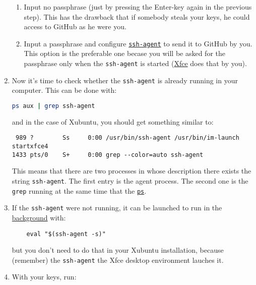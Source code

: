 \begin{enumerate}
  \begin{enumerate}
  \item Input no passphrase (just by pressing the Enter-key again in
    the previous step). This has the drawback that if somebody steals
    your keys, he could access to GitHub as he were you.
  \item Input a passphrase and configure
    \href{https://www.ssh.com/ssh/agent}{\texttt{ssh-agent}} to send
    it to GitHub by you. This option is the preferable one becase you
    will be asked for the passphrase only when the \texttt{ssh-agent}
    is started (\href{https://www.xfce.org/}{Xfce} does that by you).
  \end{enumerate}

\item Now it's time to check whether the \texttt{ssh-agent} is already
  running in your computer. This can be done with:

  \begin{lstlisting}[language=bash]
    ps aux | grep ssh-agent
  \end{lstlisting}

  and in the case of Xubuntu, you should get something similar to:

\begin{verbatim}
 989 ?        Ss     0:00 /usr/bin/ssh-agent /usr/bin/im-launch startxfce4
1433 pts/0    S+     0:00 grep --color=auto ssh-agent
\end{verbatim}

  This means that there are two processes in whose description there
  exists the string \texttt{ssh-agent}. The first entry is the agent
  process. The second one is the \texttt{grep} running at the same
  time that the
  \href{https://man7.org/linux/man-pages/man1/ps.1.html}{\texttt{ps}}.

\item If the \texttt{ssh-agent} were not running, it can be launched
  to run in
  the \href{https://en.wikipedia.org/wiki/Background_process}{background}
  with:

  \begin{verbatim}
    eval "$(ssh-agent -s)"
  \end{verbatim}

  but you don't need to do that in your Xubuntu installation, because
  (remember) the \texttt{ssh-agent} the
  Xfce desktop environment lauches it.

\item With your keys, run:


\end{enumerate}
